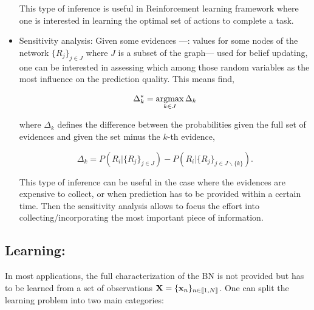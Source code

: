 \documentclass[a4paper,11pt]{report}
\begin{document}
\begin{itemize}
				This type of inference is useful in Reinforcement learning framework where one is interested in learning the optimal set of actions to complete a task.\\
				
				\item Sensitivity analysis: Given some evidences ---\ie: values for some nodes of the network $\{R_{j}\}_{j \in J}$ where $J$ is a subset of the graph--- used for belief updating, one can be interested in assessing which among those random variables as the most influence on the prediction quality. This means find,
				
				\begin{equation}
					\Delta_{k}^{\ast}= \mathop{\rm argmax}_{k \in J} \Delta_{k}
					\label{eq:BN Sensitivity analysis 1}
				\end{equation}
				
				where $\Delta_{k}$ defines the difference between the probabilities given the full set of evidences and given the set minus the $k$-th evidence,
				
        \begin{equation}
					\Delta_{k} = P(R_{i}|\{R_{j}\}_{j \in J}) - P(R_{i}|\{R_{j}\}_{j \in J\backslash \{k\}}).
					\label{eq:BN Sensitivity analysis 2}
				\end{equation}      
      
				This type of inference can be useful in the case where the evidences are expensive to collect, or when prediction has to be provided within a certain time. Then the sensitivity analysis allows to focus the effort into collecting/incorporating the most important piece of information.       
      \end{itemize}

    \subsection{Learning:}
      \label{subsec:PGMs/BN/Learning}
     
      In most applications, the full characterization of the BN is not provided but has to be learned from a set of observations ${\bf X} = \{{\bf x}_{n}\}_{n\in \llbracket 1,N \rrbracket}$. One can split the learning problem into two main categories:\\
      
\end{document}

